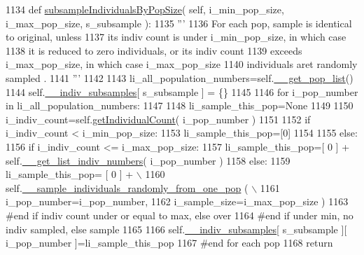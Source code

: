 \begin{DoxyCode}
1134     \textcolor{keyword}{def }\hyperlink{classnegui_1_1genepopfilemanager_1_1GenepopFileManager_afdad8528d7b19a8b2eeca447bb95a5a0}{subsampleIndividualsByPopSize}( self, i\_min\_pop\_size, i\_max\_pop\_size, 
      s\_subsample ):
1135         \textcolor{stringliteral}{'''}
1136 \textcolor{stringliteral}{        For each pop, sample is identical to original, unless }
1137 \textcolor{stringliteral}{        its indiv count is under i\_min\_pop\_size, in which case}
1138 \textcolor{stringliteral}{        it is reduced to zero individuals, or its indiv count}
1139 \textcolor{stringliteral}{        exceeds i\_max\_pop\_size, in which case i\_max\_pop\_size }
1140 \textcolor{stringliteral}{        individuals aret randomly sampled .}
1141 \textcolor{stringliteral}{        '''}
1142 
1143         li\_all\_population\_numbers=self.\hyperlink{classnegui_1_1genepopfilemanager_1_1GenepopFileManager_a0cd3178624c652968b4d319f12e5df6e}{\_\_get\_pop\_list}()
1144         self.\hyperlink{classnegui_1_1genepopfilemanager_1_1GenepopFileManager_a1e8379bcee4902ca9314ff53fcb71644}{\_\_indiv\_subsamples}[ s\_subsample ] = \{\}
1145 
1146         \textcolor{keywordflow}{for} i\_pop\_number \textcolor{keywordflow}{in} li\_all\_population\_numbers:
1147 
1148             li\_sample\_this\_pop=\textcolor{keywordtype}{None}
1149 
1150             i\_indiv\_count=self.\hyperlink{classnegui_1_1genepopfilemanager_1_1GenepopFileManager_a05e723069f5129b21a4d017c2a5317b0}{getIndividualCount}( i\_pop\_number )
1151 
1152             \textcolor{keywordflow}{if} i\_indiv\_count < i\_min\_pop\_size:
1153                 li\_sample\_this\_pop=[0]
1154 
1155             \textcolor{keywordflow}{else}:               
1156                 \textcolor{keywordflow}{if} i\_indiv\_count <= i\_max\_pop\_size:
1157                     li\_sample\_this\_pop=[ 0 ] + self.\hyperlink{classnegui_1_1genepopfilemanager_1_1GenepopFileManager_a4615769e9db90aa477aa3fd865408f54}{\_\_get\_list\_indiv\_numbers}( 
      i\_pop\_number )
1158                 \textcolor{keywordflow}{else}:
1159                     li\_sample\_this\_pop= [ 0 ] + \(\backslash\)
1160                             self.\hyperlink{classnegui_1_1genepopfilemanager_1_1GenepopFileManager_a9818467c9cb40f8e1de0c6cc7f52e263}{\_\_sample\_individuals\_randomly\_from\_one\_pop}
      ( \(\backslash\)
1161                                                                  i\_pop\_number=i\_pop\_number,
1162                                                                  i\_sample\_size=i\_max\_pop\_size )
1163                 \textcolor{comment}{#end if indiv count under or equal to max, else over}
1164             \textcolor{comment}{#end if under min, no indiv sampled, else sample}
1165 
1166             self.\hyperlink{classnegui_1_1genepopfilemanager_1_1GenepopFileManager_a1e8379bcee4902ca9314ff53fcb71644}{\_\_indiv\_subsamples}[ s\_subsample ][ i\_pop\_number ]=li\_sample\_this\_pop
1167         \textcolor{comment}{#end for each pop}
1168         \textcolor{keywordflow}{return}
\end{DoxyCode}
